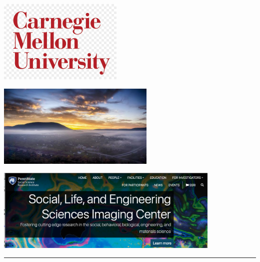 \documentclass[
  letterpaper,
  DIV=11,
  numbers=noendperiod]{scrartcl}
\begin{document}
\includegraphics[width=\linewidth,height=1.5625in,keepaspectratio]{img_gilmore_bio/cmu-logo.jpg}

\includegraphics[width=\linewidth,height=1.5625in,keepaspectratio]{img_gilmore_bio/mt-nittany.png}

\includegraphics[width=\linewidth,height=1.5625in,keepaspectratio]{img_gilmore_bio/sleic.png}

\begin{center}\rule{0.5\linewidth}{0.5pt}\end{center}
\end{document}
